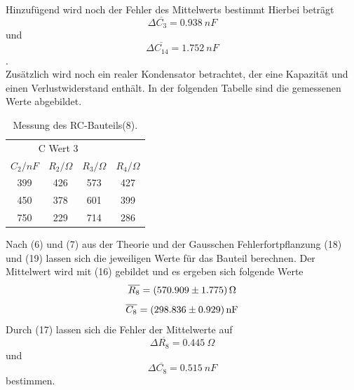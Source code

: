 Hinzufügend wird noch der Fehler des Mittelwerts bestimmt
Hierbei beträgt \\
\begin{equation*}
    \Delta \overline{C_\text{3}} = \SI{0.938}{nF}
\end{equation*}
und
\begin{equation*}
    \Delta \overline{C_\text{14}} = \SI{1,752}{nF}
\end{equation*}.\\
Zusätzlich wird noch ein realer Kondensator betrachtet, der eine Kapazität und einen Verlustwiderstand enthält.
In der folgenden Tabelle sind die gemessenen Werte abgebildet.
\begin{table}[h!]
    \begin{center}
      \caption{Messung des RC-Bauteils(8).}
      \label{tab:Tabelle 3}
      \begin{tabular}{c|c|c|c} 
        \multicolumn{3}{c}{C Wert 3} \\
        \textbf{$C_2 / nF$ } & \textbf{$R_2 / \Omega$} & \textbf{$R_3 / \Omega$} & \textbf{$R_4 / \Omega$}\\
        \hline
        399 & 426 & 573 & 427\\
        450 & 378 & 601 & 399\\
        750 & 229 & 714 & 286\\
      \end{tabular}
    \end{center}
\end{table}

Nach (6) und (7) aus der Theorie und der Gausschen Fehlerfortpflanzung (18) und (19) lassen sich die jeweiligen Werte für das Bauteil berechnen.
Der Mittelwert wird mit (16) gebildet und es ergeben sich folgende Werte
\begin{equation}
    \overline{R_\text{8}} = \SI{570,909 \pm 1,775}{\Omega} \notag
\end{equation}
\begin{equation}
    \overline{C_\text{8}} = \SI{298,836 \pm 0,929}{nF} \notag
\end{equation}
Durch (17) lassen sich die Fehler der Mittelwerte auf
\begin{equation*}
    \Delta \overline{R_\text{8}} = \SI{0,445}{\Omega}
\end{equation*}
und
\begin{equation*}
    \Delta \overline{C_\text{8}} = \SI{0.515}{nF}
\end{equation*} bestimmen.

